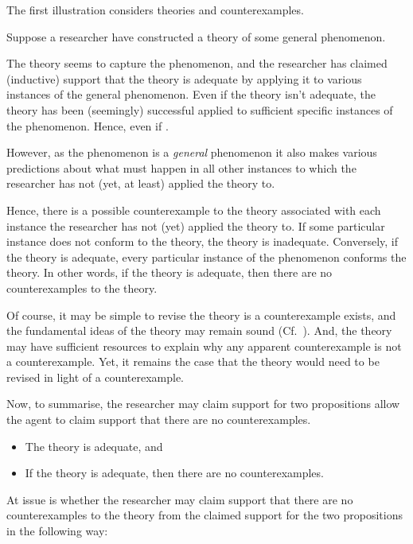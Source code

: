 \begin{note}
  The first illustration considers theories and counterexamples.

  \begin{illustration}\label{ill:CE:main}
    Suppose a researcher have constructed a theory of some general phenomenon.

    The theory seems to capture the phenomenon, and the researcher has claimed (inductive) support that the theory is adequate by applying it to various instances of the general phenomenon.
    Even if the theory isn't adequate, the theory has been (seemingly) successful applied to sufficient specific instances of the phenomenon.
    Hence, even if \mom{}.

    However, as the phenomenon is a \emph{general} phenomenon it also makes various predictions about what must happen in all other instances to which the researcher has not (yet, at least) applied the theory to.

    Hence, there is a possible counterexample to the theory associated with each instance the researcher has not (yet) applied the theory to.
    If some particular instance does not conform to the theory, the theory is inadequate.
    Conversely, if the theory is adequate, every particular instance of the phenomenon conforms the theory.
    In other words, if the theory is adequate, then there are no counterexamples to the theory.

    Of course, it may be simple to revise the theory is a counterexample exists, and the fundamental ideas of the theory may remain sound (Cf.~\textcite{Bonevac:2011tz}).
    And, the theory may have sufficient resources to explain why any apparent counterexample is not a counterexample.
    Yet, it remains the case that the theory would need to be revised in light of a counterexample.

    Now, to summarise, the researcher may claim support for two propositions allow the agent to claim support that there are no counterexamples.

    \begin{itemize}
    \item The theory is adequate, and
    \item If the theory is adequate, then there are no counterexamples.
    \end{itemize}

    At issue is whether the researcher may claim support that there are no counterexamples to the theory from the claimed support for the two propositions in the following way:


\end{illustration}
\end{note}
